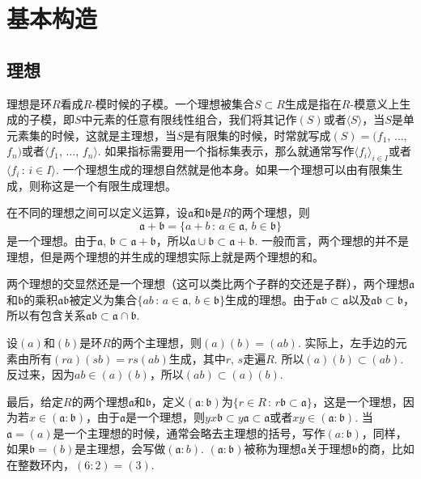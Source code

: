 \chapter{基本构造}

\section{理想}

\para[理想] 理想是环$R$看成$R$-模时候的子模。一个理想被集合$S\subset R$生成是指在$R$-模意义上生成的子模，即$S$中元素的任意有限线性组合，我们将其记作$(S)$或者$\langle S\rangle$，当$S$是单元素集的时候，这就是主理想，当$S$是有限集的时候，时常就写成$(S)=(f_1$, $\dots$, $f_n)$或者$\langle f_1$, $\dots$, $f_n\rangle$. 如果指标需要用一个指标集表示，那么就通常写作$\langle f_i\rangle_{i\in I}$或者$\langle f_i\,:\,i\in I\rangle$. 一个理想生成的理想自然就是他本身。如果一个理想可以由有限集生成，则称这是一个有限生成理想。\endpara

\para[理想的运算] 在不同的理想之间可以定义运算，设$\mathfrak{a}$和$\mathfrak{b}$是$R$的两个理想，则
\[
\mathfrak{a}+\mathfrak{b}=\{a+b\,:\,a\in\mathfrak{a},\,b\in\mathfrak{b}\}
\]
是一个理想。由于$\mathfrak{a}$, $\mathfrak{b}\subset \mathfrak{a}+\mathfrak{b}$，所以$\mathfrak{a}\cup\mathfrak{b}\subset \mathfrak{a}+\mathfrak{b}$. 一般而言，两个理想的并不是理想，但是两个理想的并生成的理想实际上就是两个理想的和。

两个理想的交显然还是一个理想（这可以类比两个子群的交还是子群），两个理想$\mathfrak{a}$和$\mathfrak{b}$的乘积$\mathfrak{a}\mathfrak{b}$被定义为集合$\{ab\,:\,a\in\mathfrak{a},\,b\in\mathfrak{b}\}$生成的理想。由于$\mathfrak{a}\mathfrak{b}\subset \mathfrak{a}$以及$\mathfrak{a}\mathfrak{b}\subset \mathfrak{b}$，所以有包含关系$\mathfrak{a}\mathfrak{b}\subset \mathfrak{a}\cap \mathfrak{b}$.

设$(a)$和$(b)$是环$R$的两个主理想，则$(a)(b)=(ab)$. 实际上，左手边的元素由所有$(ra)(sb)=rs(ab)$生成，其中$r$, $s$走遍$R$. 所以$(a)(b)\subset (ab)$. 反过来，因为$ab\in (a)(b)$，所以$(ab)\subset (a)(b)$.

最后，给定$R$的两个理想$\mathfrak{a}$和$\mathfrak{b}$，定义$(\mathfrak{a}:\mathfrak{b})$为$\{r\in R\,:\, r\mathfrak{b}\subset \mathfrak{a}\}$，这是一个理想，因为若$x\in (\mathfrak{a}:\mathfrak{b})$，由于$\mathfrak{a}$是一个理想，则$yx\mathfrak{b}\subset y\mathfrak{a}\subset \mathfrak{a}$或者$xy\in (\mathfrak{a}:\mathfrak{b})$. 当$\mathfrak{a}=(a)$是一个主理想的时候，通常会略去主理想的括号，写作$(a:\mathfrak{b})$，同样，如果$\mathfrak{b}=(b)$是主理想，会写做$(\mathfrak{a}:b)$. $(\mathfrak{a}:\mathfrak{b})$被称为理想$\mathfrak{a}$关于理想$\mathfrak{b}$的商，比如在整数环内，$(6:2)=(3)$.
\endpara

